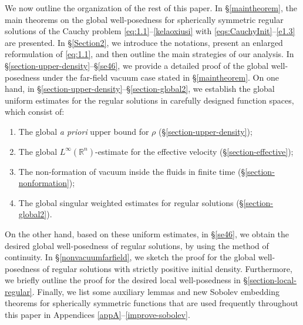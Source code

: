 \documentclass[11pt,reqno]{amsart}
\numberwithin{rk}{section}
\numberwithin{prop}{section}
\numberwithin{mydef}{section}
\numberwithin{lem}{section}
\numberwithin{equation}{section}
\numberwithin{thm}{section}
\begin{document}
We now outline the organization of the rest of this paper.
In \S \ref{maintheorem}, the main theorems on the global well-posedness for spherically symmetric regular solutions of the Cauchy problem \eqref{eq:1.1}--\eqref{kelaoxiusi} with \eqref{eqs:CauchyInit}--\eqref{e1.3} are presented.
In \S \ref{Section2}, we introduce the notations, present an enlarged reformulation of \eqref{eq:1.1}, and then outline the main strategies of our analysis. 
In \S \ref{section-upper-density}--\S \ref{se46}, we provide a detailed proof of the global well-posedness under the far-field vacuum case stated in \S \ref{maintheorem}. 
On one hand, in \S \ref{section-upper-density}--\S \ref{section-global2}, 
we establish the global uniform estimates for the regular solutions in carefully designed  function spaces, which consist of:
\begin{enumerate}
\item[(i)] The global {\it a priori} upper bound for $\rho$ (\S \ref{section-upper-density});
\vspace{3pt}
\item[(ii)] The global  $L^\infty(\mathbb{R}^n)$-estimate for the effective velocity (\S \ref{section-effective});
\vspace{3pt}
\item[(iii)] The non-formation of vacuum  inside the fluids  in finite time (\S \ref{section-nonformation});
\vspace{3pt}
\item[(iv)] The global singular weighted  estimates for regular solutions (\S \ref{section-global2}).
\end{enumerate}
On the other hand, based on these uniform estimates, in \S \ref{se46}, we obtain the desired  global well-posedness 
of   regular solutions,
by using the method of continuity. In \S \ref{nonvacuumfarfield}, we sketch the proof for the global well-posedness of regular solutions with strictly positive initial density. Furthermore, we briefly outline the proof for the desired local well-posedness in \S \ref{section-local-regular}. Finally, we list some auxiliary lemmas and new Sobolev embedding theorems 
for spherically symmetric functions that are used frequently throughout this paper 
in  Appendices \ref{appA}--\ref{improve-sobolev}.
\end{document}
